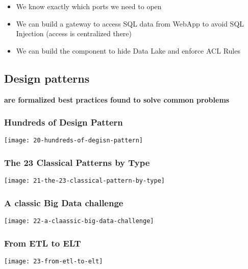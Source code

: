 \begin{itemize}
	\item We know exactly which ports we need to open
	\item We can build a gateway to access SQL data from WebApp to avoid SQL Injection (access is centralized there)
	\item We can build the component to hide Data Lake and enforce ACL Rules
\end{itemize}

\subsection{Design patterns}
\textbf{are formalized best practices found to solve common problems}

\subsubsection{Hundreds of Design Pattern}
\begin{center}
\texttt{[image: 20-hundreds-of-degisn-pattern]}
\end{center}

\subsubsection{The 23 Classical Patterns by Type}
\begin{center}
\texttt{[image: 21-the-23-classical-pattern-by-type]}
\end{center}

\subsubsection{A classic Big Data challenge}
\begin{center}
\texttt{[image: 22-a-claassic-big-data-challenge]}
\end{center}

\subsubsection{From ETL to ELT}
\begin{center}
\texttt{[image: 23-from-etl-to-elt]}
\end{center}